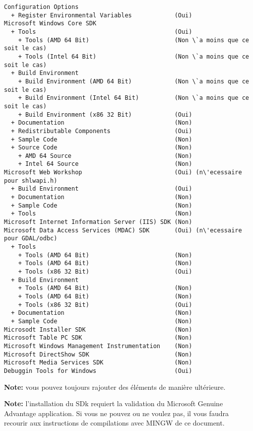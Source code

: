 \begin{verbatim}
Configuration Options
  + Register Environmental Variables            (Oui)
Microsoft Windows Core SDK
  + Tools                                       (Oui)
    + Tools (AMD 64 Bit)                        (Non \`a moins que ce soit le cas)
    + Tools (Intel 64 Bit)                      (Non \`a moins que ce soit le cas)
  + Build Environment
    + Build Environment (AMD 64 Bit)            (Non \`a moins que ce soit le cas)
    + Build Environment (Intel 64 Bit)          (Non \`a moins que ce soit le cas)
    + Build Environment (x86 32 Bit)            (Oui)
  + Documentation                               (Non)
  + Redistributable Components                  (Oui)
  + Sample Code                                 (Non)
  + Source Code                                 (Non)
    + AMD 64 Source                             (Non)
    + Intel 64 Source                           (Non)
Microsoft Web Workshop                          (Oui) (n\'ecessaire pour shlwapi.h)
  + Build Environment                           (Oui)
  + Documentation                               (Non)
  + Sample Code                                 (Non)
  + Tools                                       (Non)
Microsoft Internet Information Server (IIS) SDK (Non)
Microsoft Data Access Services (MDAC) SDK       (Oui) (n\'ecessaire pour GDAL/odbc)
  + Tools
    + Tools (AMD 64 Bit)                        (Non)
    + Tools (AMD 64 Bit)                        (Non)
    + Tools (x86 32 Bit)                        (Oui)
  + Build Environment
    + Tools (AMD 64 Bit)                        (Non)
    + Tools (AMD 64 Bit)                        (Non)
    + Tools (x86 32 Bit)                        (Oui)
  + Documentation                               (Non)
  + Sample Code                                 (Non)
Microsodt Installer SDK                         (Non)
Microsoft Table PC SDK                          (Non)
Microsoft Windows Management Instrumentation    (Non)
Microsoft DirectShow SDK                        (Non)
Microsoft Media Services SDK                    (Non)
Debuggin Tools for Windows                      (Oui)
\end{verbatim}

\textbf{Note:} vous pouvez toujours rajouter des \'el\'ements de mani\`ere ult\'erieure.

\textbf{Note:} l'installation du SDk requiert la validation du Microsoft Genuine Advantage application. Si vous ne pouvez ou ne voulez pas, il vous faudra recourir aux instructions de compilations avec MINGW  de ce document.

